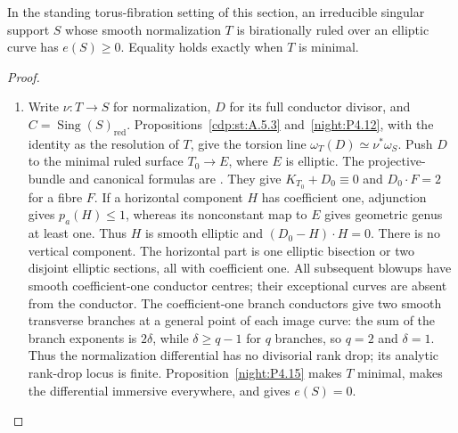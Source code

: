 \begin{proposition}\hypertarget{tag-02WU}{}\label{night:P4.22}\label{stmt:P4.22}

In the standing torus-fibration setting of this section, an irreducible singular support
$S$ whose smooth normalization $T$ is birationally ruled
over an elliptic curve has $e(S)\ge0$. Equality holds
exactly when $T$ is minimal.
\end{proposition}
\begin{proof}

\begin{enumerate}[label={$\langle1\rangle$\arabic*.},leftmargin=*]
\item Write $\nu:T\to S$ for normalization, $D$ for its full
conductor divisor, and $C=\operatorname{Sing}(S)_{\mathrm{red}}$.
Propositions~\ref{cdp:st:A.5.3} and~\ref{night:P4.12}, with the
identity as the resolution of $T$, give the torsion line
$\omega_T(D)\simeq\nu^*\omega_S$.
Push $D$ to the minimal ruled surface $T_0\to E$, where $E$ is
elliptic. The projective-bundle and canonical formulas are
\cite[III.10, p.~40; III.18, pp.~46--47]{Beauville1978}.
They give $K_{T_0}+D_0\equiv0$ and $D_0\cdot F=2$ for a fibre $F$. If a horizontal component $H$
has coefficient one, adjunction gives $p_a(H)\le1$,
whereas its nonconstant map to $E$ gives geometric
genus at least one. Thus $H$ is smooth elliptic and
$(D_0-H)\cdot H=0$. There is no vertical component.
The horizontal part is one elliptic bisection or two
disjoint elliptic sections, all with coefficient one.
All subsequent blowups have smooth coefficient-one
conductor centres; their exceptional curves are absent
from the conductor. The coefficient-one branch conductors give two smooth
transverse branches at a general point of each image curve:
the sum of the branch exponents is $2\delta$, while
$\delta\ge q-1$ for $q$ branches, so $q=2$ and $\delta=1$.
Thus the normalization differential has no divisorial rank drop;
its analytic rank-drop locus is finite.
Proposition~\ref{night:P4.15} makes $T$ minimal,
makes the differential immersive everywhere, and
gives $e(S)=0$.


\end{enumerate}
\end{proof}
